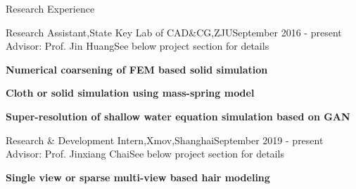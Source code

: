 \documentclass{resume} %
\begin{document}
\begin{rSection}{Research Experience}

  \begin{rSubsection}{Research Assistant,State Key Lab of CAD\&CG,ZJU}{September 2016 - present}
    {Advisor: Prof. Jin Huang}{See below project section for details}
\item {\bf Numerical coarsening of FEM based solid simulation}
\item {\bf Cloth or solid simulation using mass-spring model} 
\item {\bf Super-resolution of shallow water equation simulation based on GAN}
  \end{rSubsection}
  \begin{rSubsection}{Research \& Development Intern,Xmov,Shanghai}{September 2019 - present}
    {Advisor: Prof. Jinxiang Chai}{See below project section for details}
\item {\bf Single view or sparse multi-view based hair modeling}
  \end{rSubsection}

\end{rSection}
\end{document}
